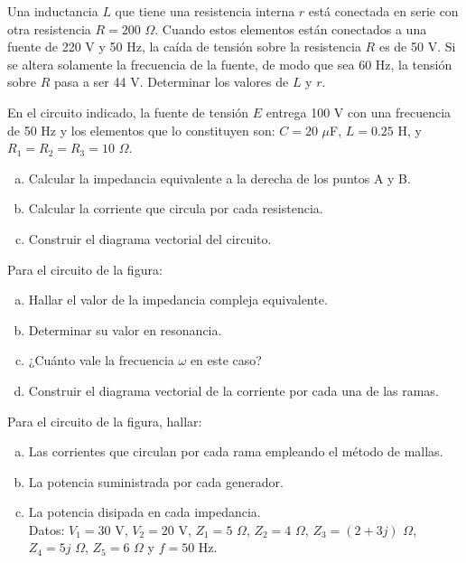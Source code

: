 \documentclass[problemas]{guia}
\begin{document}
\begin{problema}{}
    Una inductancia $L$ que tiene una resistencia interna $r$ está conectada en
    serie con otra resistencia $R = 200$ $\Omega$. Cuando estos elementos están
    conectados a una fuente de 220 V y 50 Hz, la caída de tensión sobre la 
    resistencia $R$ es de 50 V. Si se altera solamente la frecuencia de la 
    fuente, de modo que sea 60 Hz, la tensión sobre $R$ pasa a ser 44 V. 
    Determinar los valores de $L$ y $r$.
\end{problema}


\begin{problema}{}
    En el circuito indicado, la fuente de tensión $E$ entrega 100 V con una 
    frecuencia de 50 Hz y los elementos que lo constituyen son:
    $C = 20$ $\mu$F, $L = 0.25$ H, y $R_1 = R_2 = R_3 = 10$ $\Omega$. 
    \begin{enumerate}[(a)]
        \item Calcular la impedancia equivalente a la derecha de los puntos 
            A y B.
        \item Calcular la corriente que circula por cada resistencia.
        \item Construir el diagrama vectorial del circuito.
\end{enumerate}
\end{problema}

\begin{problema}{}
    Para el circuito de la figura:
    \begin{enumerate}[(a)]
        \item Hallar el valor de la impedancia compleja equivalente.
        \item Determinar su valor en resonancia.
        \item ¿Cuánto vale la frecuencia $\omega$ en este caso?
        \item Construir el diagrama vectorial de la corriente por cada una
            de las ramas.
    \end{enumerate}
\end{problema}

\begin{problema}{}
    Para el circuito de la figura, hallar:
    \begin{enumerate}[(a)]
        \item Las	corrientes	que	circulan por	cada	rama empleando el 
            método de mallas.
        \item La potencia suministrada por cada generador.
        \item La potencia disipada en cada impedancia. \\

    Datos: $V_1 = 30$ V, $V_2 = 20$ V, $Z_1 = 5$ $\Omega$, $Z_2 = 4$ $\Omega$,
    $Z_3  = (2+3j)$ $\Omega$, $Z_4 = 5j$ $\Omega$, $Z_5 = 6$ $\Omega$ y 
    $f = 50$ Hz.
    \end{enumerate}
\end{problema}
\end{document}
